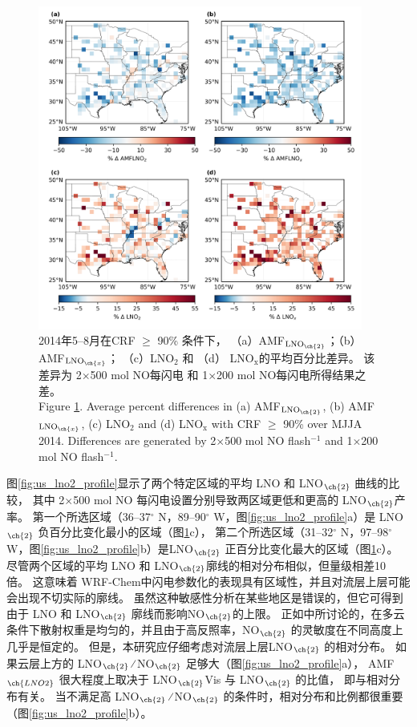 \begin{figure}[H]
\centering
\includegraphics[width=0.95\textwidth]{./figures/us_simulation_diff.png}
\caption{2014年5--8月在CRF $\geq$ 90\% 条件下，
（a）AMF$_{\textrm{LNO$_{\ch{2}}$}}$；（b）AMF$_{\textrm{LNO$_{\ch{x}}$}}$；
（c）LNO$_\textrm{2}$ 和 （d） LNO$_\textrm{x}$的平均百分比差异。
该差异为 2$\times$500 mol NO每闪电 和 1$\times$200 mol NO每闪电所得结果之差。\\
Figure \ref{fig:us_simulation_diff}. Average percent differences in (a) AMF$_{\textrm{LNO$_{\ch{2}}$}}$, (b) AMF$_{\textrm{LNO$_{\ch{x}}$}}$, (c) LNO$_\textrm{2}$ and (d) LNO$_\textrm{x}$ with CRF $\geq$ 90\% over MJJA 2014.
Differences are generated by 2$\times$500 mol NO flash$^{-1}$ and 1$\times$200 mol NO flash$^{-1}$.}
\label{fig:us_simulation_diff}
\end{figure}


图\ref{fig:us_lno2_profile}显示了两个特定区域的平均 LNO 和 LNO$_{\ch{2}}$ 曲线的比较，
其中 2$\times$500 mol NO 每闪电设置分别导致两区域更低和更高的 LNO$_{\ch{2}}$产率。
第一个所选区域（36--37$^{\circ}$ N，89--90$^{\circ}$ W，图\ref{fig:us_lno2_profile}a）是 LNO$_{\ch{2}}$ 负百分比变化最小的区域（图\ref{fig:us_simulation_diff}c），
第二个所选区域（31--32$^{\circ}$ N，97--98$^{\circ}$ W，图\ref{fig:us_lno2_profile}b）是LNO$_{\ch{2}}$ 正百分比变化最大的区域（图\ref{fig:us_simulation_diff}c）。
尽管两个区域的平均 LNO 和 LNO$_{\ch{2}}$廓线的相对分布相似，但量级相差10 倍。
这意味着 WRF-Chem中闪电参数化的表现具有区域性，并且对流层上层可能会出现不切实际的廓线。
虽然这种敏感性分析在某些地区是错误的，但它可得到由于 LNO 和 LNO$_{\ch{2}}$ 廓线而影响NO$_{\ch{2}}$的上限。
正如\citet{Laughner.2017}中所讨论的，在多云条件下散射权重是均匀的，并且由于高反照率，NO$_{\ch{2}}$ 的灵敏度在不同高度上几乎是恒定的。
但是，本研究应仔细考虑对流层上层LNO$_{\ch{2}}$ 的相对分布。
如果云层上方的 LNO$_{\ch{2}}$ ∕ NO$_{\ch{2}}$ 足够大（图\ref{fig:us_lno2_profile}a），
AMF$_{\ch{LNO2}}$ 很大程度上取决于 LNO$_{\ch{2}}$Vis 与 LNO$_{\ch{2}}$ 的比值，
即与相对分布有关。
当不满足高 LNO$_{\ch{2}}$ ∕ NO$_{\ch{2}}$ 的条件时，相对分布和比例都很重要（图\ref{fig:us_lno2_profile}b）。


